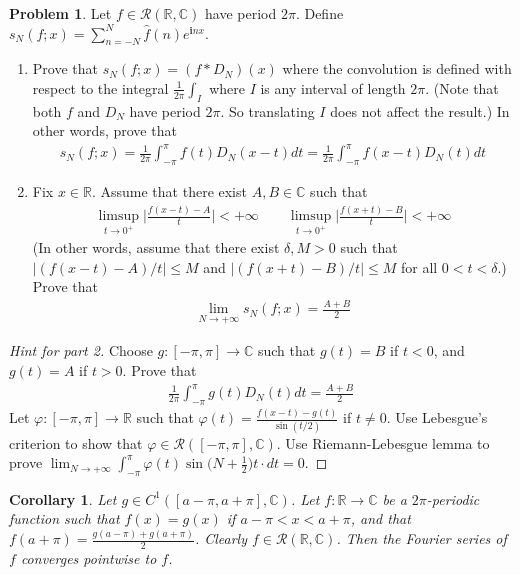 \documentclass[12pt,b5paper,notitlepage]{article}
\theoremstyle{definition}
\newtheorem{prob}{\color{red}Problem}[section]
\theoremstyle{plain}
\newtheorem{co}[df]{Corollary}
\newcommand{\wht}{\widehat}
\newcommand{\scr}{\mathscr}
\newcommand{\im}{\mathbf{i}}
\newcommand{\Cbb}{\mathbb C}
\newcommand{\Rbb}{\mathbb R}
\newcommand{\dps}{\displaystyle}
\numberwithin{equation}{section}
\begin{document}
\begin{prob}\label{lb447}
Let $f\in\scr R(\Rbb,\Cbb)$ have period $2\pi$. Define $\dps s_N(f;x)=\sum_{n=-N}^N\wht f(n)e^{\im nx}$.
\begin{enumerate}
\item Prove that $s_N(f;x)=(f*D_N)(x)$ where the convolution is defined with respect to the integral $\frac 1{2\pi}\int_I$ where $I$ is any interval of length $2\pi$. (Note that both $f$ and $D_N$ have period $2\pi$. So translating $I$ does not affect the result.) In other words, prove that
\begin{align}
s_N(f;x)=\frac 1{2\pi}\int_{-\pi}^{\pi} f(t)D_N(x-t)dt=\frac 1{2\pi}\int_{-\pi}^{\pi} f(x-t)D_N(t)dt
\end{align}
\item Fix $x\in\Rbb$. Assume that there exist $A,B\in\Cbb$ such that 
\begin{align}
\limsup_{t\rightarrow 0^+}\Big|\frac{f(x-t)-A}{t}\Big|<+\infty\qquad \limsup_{t\rightarrow 0^+}\Big|\frac{f(x+t)-B}{t}\Big|<+\infty
\end{align}
(In other words, assume that there exist $\delta,M>0$ such that $|(f(x-t)-A)/t|\leq M$ and $|(f(x+t)-B)/t|\leq M$ for all $0<t<\delta$.) Prove that
\begin{align}
\lim_{N\rightarrow+\infty} s_N(f;x)=\frac{A+B}2
\end{align}
\end{enumerate}
\end{prob}


\begin{proof}[Hint for part 2]
Choose $g:[-\pi,\pi]\rightarrow\Cbb$ such that $g(t)=B$ if $t<0$, and $g(t)=A$ if $t>0$. Prove that
\begin{align}
\frac 1{2\pi}\int_{-\pi}^\pi g(t)D_N(t)dt=\frac{A+B}2  \label{eq193}
\end{align}
Let $\varphi:[-\pi,\pi]\rightarrow \Rbb$ such that $\dps\varphi(t)=\frac{f(x-t)-g(t)}{\sin(t/2)}$ if $t\neq 0$. Use Lebesgue's criterion to show that $\varphi\in\scr R([-\pi,\pi],\Cbb)$. Use Riemann-Lebesgue lemma to prove $\dps\lim_{N\rightarrow+\infty}\int_{-\pi}^\pi \varphi(t)\sin\big(N+\frac 12\big)t\cdot dt=0$. %
\end{proof}


\begin{co}\label{lb448}
Let $g\in C^1([a-\pi,a+\pi],\Cbb)$. Let $f:\Rbb\rightarrow\Cbb$ be a $2\pi$-periodic function such that $f(x)=g(x)$ if $a-\pi<x<a+\pi$, and that $\dps f(a+\pi)=\frac{g(a-\pi)+g(a+\pi)}2$. Clearly $f\in\scr R(\Rbb,\Cbb)$. Then the Fourier series of $f$ converges pointwise to $f$.
\end{co}
\end{document}

